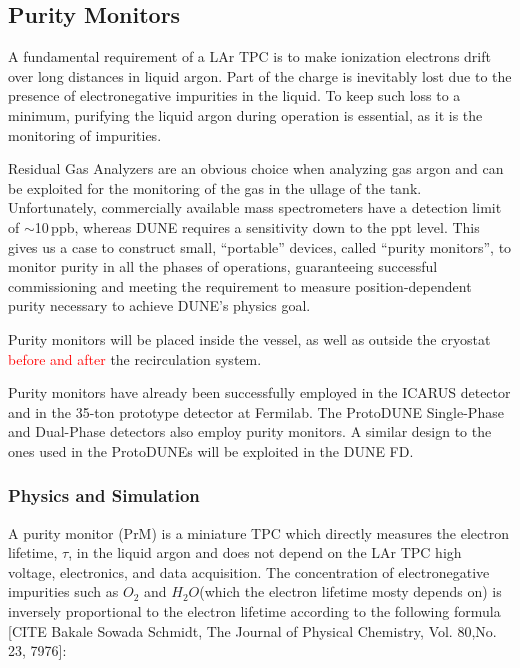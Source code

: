 \subsection{Purity Monitors} 
\label{sec:fdsp-slow-cryo-purity-mon}
A fundamental requirement of a LAr TPC is to make ionization electrons drift over long distances in liquid argon. Part of the charge is inevitably lost due to the presence of electronegative impurities in the liquid. To keep such loss to a minimum, purifying the liquid argon during operation is essential, as it is the monitoring of impurities.

Residual Gas Analyzers are an obvious choice when analyzing gas argon and can be exploited for the monitoring of the gas in the ullage of the tank. Unfortunately, commercially available mass spectrometers have a detection limit of $\sim$10\,ppb, whereas DUNE requires a sensitivity down to the ppt level. This gives us a case to construct small, ``portable'' devices, called ``purity monitors'', to monitor purity in all the phases of operations, guaranteeing successful commissioning and meeting the requirement to measure position-dependent purity necessary to achieve DUNE's physics goal. 

Purity monitors will be placed inside the vessel, as well as outside the cryostat \textcolor{red}{before and after} the recirculation system.

Purity monitors have already been successfully employed in the ICARUS detector and in the 35-ton prototype detector at Fermilab. The ProtoDUNE Single-Phase and Dual-Phase detectors also employ purity monitors. A similar design to the ones used in the ProtoDUNEs will be exploited in the DUNE FD.

\subsubsection{Physics and Simulation}
A purity monitor (PrM) is a miniature TPC which directly measures the electron lifetime, $\tau$, in the liquid argon and does not depend on the LAr TPC high voltage, electronics, and data acquisition. The concentration of electronegative impurities such as $O_2$ and $H_2O$(which the electron lifetime mosty depends on) is inversely proportional to the electron lifetime according to the following formula [CITE Bakale Sowada Schmidt, The Journal of Physical Chemistry, Vol. 80,No. 23, 7976]:


